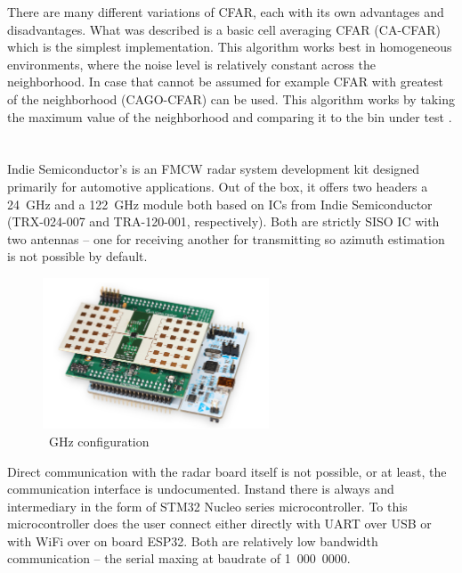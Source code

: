 There are many different variations of CFAR, each with its own advantages and disadvantages.
What was described is a basic cell averaging CFAR (CA-CFAR) which is the simplest implementation.
This algorithm works best in homogeneous environments, where the noise level is relatively constant across the neighborhood.
In case that cannot be assumed for example CFAR with greatest of the neighborhood (CAGO-CFAR) can be used.
This algorithm works by taking the maximum value of the neighborhood and comparing it to the bin under test \cite{rohling1983}.

\chapter{\sidar}

Indie Semiconductor's \sidar is an FMCW radar system development kit designed primarily for automotive applications.
Out of the box, it offers two headers a 24~GHz and a 122~GHz module both based on ICs from Indie Semiconductor (TRX-024-007 and TRA-120-001, respectively).
Both are strictly SISO IC with two antennas -- one for receiving another for transmitting so azimuth estimation is not possible by default.

\begin{figure}[h!]
  \centering
  \includegraphics[width=0.6\textwidth]{../img/sidar.png}

  \caption[\sidar \cite{sidarMANOld}]{~GHz configuration}
  \label{fig:sidar}
\end{figure}

Direct communication with the radar board itself is not possible, or at least, the communication interface is undocumented.
Instand there is always and intermediary in the form of  STM32 Nucleo series microcontroller.
To this microcontroller does the user connect either directly with UART over USB or with WiFi over on board ESP32.
Both are relatively low bandwidth communication -- the serial maxing at baudrate of 1~000~0000.


